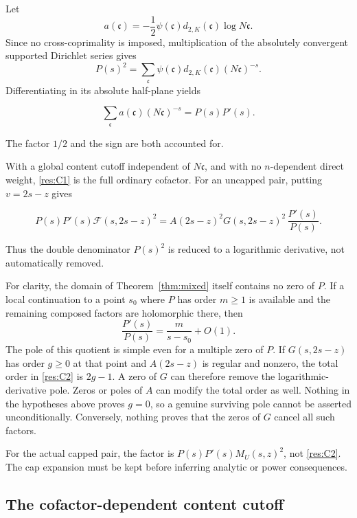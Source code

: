 \documentclass[11pt]{article}
\numberwithin{equation}{section}
\newcommand{\F}{\mathcal F}
\begin{document}
Let \[
 a(\mathfrak c)=-\frac12\psi(\mathfrak c)
 d_{2,K}(\mathfrak c)\log N\mathfrak c.
\] Since no cross-coprimality is imposed, multiplication of the
absolutely convergent supported Dirichlet series gives \[
 P(s)^2=\sum_{\mathfrak c}
 \psi(\mathfrak c)d_{2,K}(\mathfrak c)(N\mathfrak c)^{-s}.
\] Differentiating in its absolute half-plane yields

\begin{equation}\label{res:C1}
\sum_{\mathfrak c}a(\mathfrak c)(N\mathfrak c)^{-s}
 =P(s)P'(s).
\end{equation}

The factor \(1/2\) and the sign are both accounted for.

With a global content cutoff independent of \(N\mathfrak c\), and with
no \(n\)-dependent direct weight, \eqref{res:C1} is the full ordinary
cofactor. For an uncapped pair, putting \(v=2s-z\) gives

\begin{equation}\label{res:C2}
P(s)P'(s)\F(s,2s-z)^2
 =A(2s-z)^2G(s,2s-z)^2\,\frac{P'(s)}{P(s)}.
\end{equation}

Thus the double denominator \(P(s)^2\) is reduced to a logarithmic
derivative, not automatically removed.

For clarity, the domain of Theorem~\ref{thm:mixed}
itself contains no zero of \(P\). If a local continuation to a point
\(s_0\) where \(P\) has order \(m\geq1\) is available and the remaining
composed factors are holomorphic there, then \[
 \frac{P'(s)}{P(s)}=\frac{m}{s-s_0}+O(1).
\] The pole of this quotient is simple even for a multiple zero of
\(P\). If \(G(s,2s-z)\) has order \(g\geq0\) at that point and
\(A(2s-z)\) is regular and nonzero, the total order in \eqref{res:C2} is
\(2g-1\). A zero of \(G\) can therefore remove the
logarithmic-derivative pole. Zeros or poles of \(A\) can modify the
total order as well. Nothing in the hypotheses above proves \(g=0\), so
a genuine surviving pole cannot be asserted unconditionally. Conversely,
nothing proves that the zeros of \(G\) cancel all such factors.

For the actual capped pair, the factor is \(P(s)P'(s)M_U(s,z)^2\), not
\eqref{res:C2}. The cap expansion must be kept before inferring analytic
or power consequences.

\subsection{The cofactor-dependent content
cutoff}\label{the-cofactor-dependent-content-cutoff}
\end{document}
